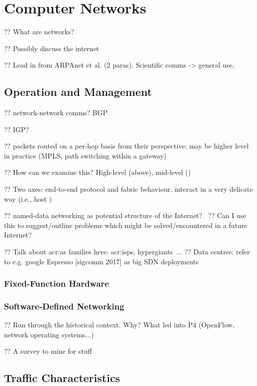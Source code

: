 \chapter{Computer Networks}

?? What are networks?

?? Possibly discuss the internet

?? Lead in from ARPAnet et al. (2 paras). Scientific comms -> general use,

\section{Operation and Management}

?? network-network comms? BGP

?? IGP?

?? packets routed on a per-hop basis from their perspective: may be higher level in practice (MPLS, path switching within a gateway)

?? How can we examine this? High-level (above), mid-level ()

?? Two axes: end-to-end protocol and fabric behaviour. interact in a very delicate way (i.e., host )

?? named-data networking as potential structure of the Internet?~\parencite{DBLP:journals/ccr/0001ABJcCPWZ14}
?? Can I use this to suggest/outline problems which might be solved/encountered in a future Internet?

?? Talk about \gls{acr:as} families here: \glspl{acr:isp}, hypergiants~\parencite{DBLP:conf/sigcomm/GigisCMNKDKS21}...
?? Data centres: refer to e.g. google Espresso [sigcomm 2017] as big SDN deployments

\subsection{Fixed-Function Hardware}

\subsection{Software-Defined Networking}

?? Run through the historical context. Why? What led into P4 (OpenFlow, network operating systems...)

?? A survey to mine for stuff~\parencite{DBLP:journals/comsur/NunesMNOT14}

\section{Traffic Characteristics}

